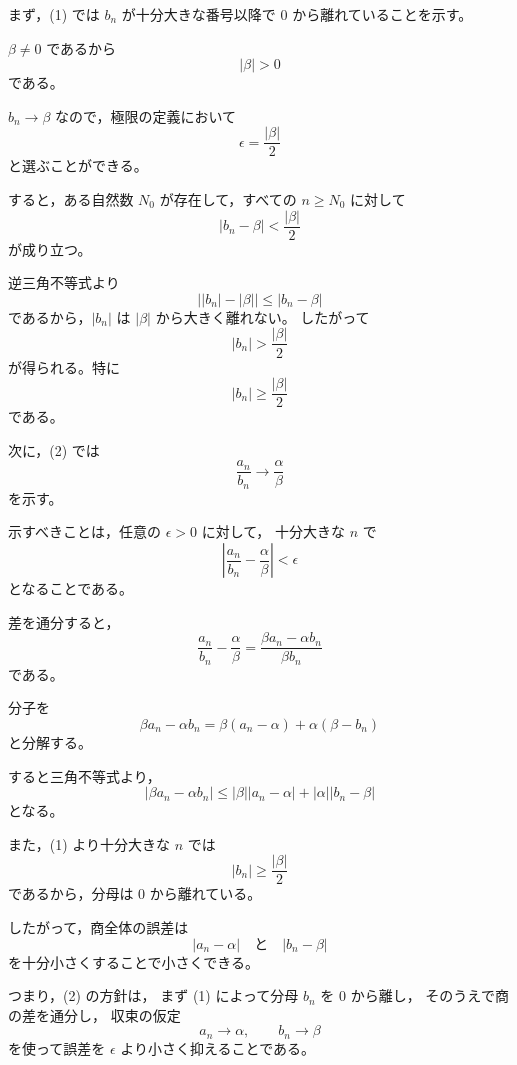\begin{strategy}
	まず，(1) では $b_n$ が十分大きな番号以降で $0$ から離れていることを示す。

	$\beta\neq 0$ であるから
	\[
		|\beta|>0
	\]
	である。

	$b_n\to\beta$ なので，極限の定義において
	\[
		\epsilon=\frac{|\beta|}{2}
	\]
	と選ぶことができる。

	すると，ある自然数 $N_0$ が存在して，すべての $n\geq N_0$ に対して
	\[
		|b_n-\beta|<\frac{|\beta|}{2}
	\]
	が成り立つ。

	逆三角不等式より
	\[
		\bigl||b_n|-|\beta|\bigr|
		\leq |b_n-\beta|
	\]
	であるから，$|b_n|$ は $|\beta|$ から大きく離れない。
	したがって
	\[
		|b_n|>\frac{|\beta|}{2}
	\]
	が得られる。特に
	\[
		|b_n|\geq\frac{|\beta|}{2}
	\]
	である。

	次に，(2) では
	\[
		\frac{a_n}{b_n}\to\frac{\alpha}{\beta}
	\]
	を示す。

	示すべきことは，任意の $\epsilon>0$ に対して，
	十分大きな $n$ で
	\[
		\left|
			\frac{a_n}{b_n}
			-
			\frac{\alpha}{\beta}
		\right|<\epsilon
	\]
	となることである。

	差を通分すると，
	\[
		\frac{a_n}{b_n}-\frac{\alpha}{\beta}
		=
		\frac{\beta a_n-\alpha b_n}{\beta b_n}
	\]
	である。

	分子を
	\[
		\beta a_n-\alpha b_n
		=
		\beta(a_n-\alpha)+\alpha(\beta-b_n)
	\]
	と分解する。

	すると三角不等式より，
	\[
		|\beta a_n-\alpha b_n|
		\leq
		|\beta||a_n-\alpha|
		+
		|\alpha||b_n-\beta|
	\]
	となる。

	また，(1) より十分大きな $n$ では
	\[
		|b_n|\geq \frac{|\beta|}{2}
	\]
	であるから，分母は $0$ から離れている。

	したがって，商全体の誤差は
	\[
		|a_n-\alpha|
		\quad\text{と}\quad
		|b_n-\beta|
	\]
	を十分小さくすることで小さくできる。

	つまり，(2) の方針は，
	まず (1) によって分母 $b_n$ を $0$ から離し，
	そのうえで商の差を通分し，
	収束の仮定
	\[
		a_n\to\alpha,
		\qquad
		b_n\to\beta
	\]
	を使って誤差を $\epsilon$ より小さく抑えることである。
\end{strategy}